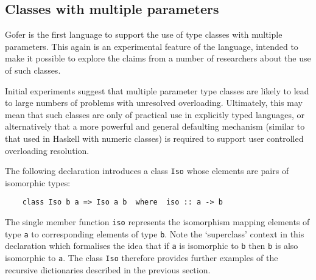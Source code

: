 \subsection{Classes with multiple parameters}
Gofer is the first language to support the use  of  type  classes  with
multiple parameters.  This again is  an  experimental  feature  of  the
language, intended to make it possible to explore  the  claims  from  a
number of researchers about the use of such classes.

Initial experiments suggest that multiple parameter  type  classes  are
likely  to  lead  to  large  numbers  of   problems   with   unresolved
overloading.  Ultimately, this may mean that such classes are  only  of
practical use in explicitly typed languages, or  alternatively  that  a
more powerful and general defaulting mechanism (similar to that used in
Haskell with numeric classes) is required to  support  user  controlled
overloading resolution.

The following declaration introduces a class  \verb"Iso"  whose  elements  are
pairs of isomorphic types:
\begin{verbatim}
    class Iso b a => Iso a b  where  iso :: a -> b
\end{verbatim}
The single member function \verb"iso"  represents  the  isomorphism  mapping
elements of type \verb"a" 
to corresponding  elements  of  type  \verb"b".   Note  the
`superclass' context in this declaration which formalises the idea that
if \verb"a" is isomorphic to \verb"b" 
then \verb"b" is also isomorphic to \verb"a".  The class  \verb"Iso"
therefore provides  further  examples  of  the  recursive  dictionaries
described in the previous section.

